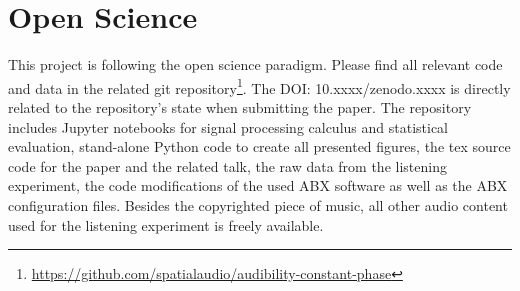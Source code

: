 \section*{Open Science}
This project is following the open science paradigm.
%
Please find all relevant code and data in the related git repository\footnote{
\url{https://github.com/spatialaudio/audibility-constant-phase}}.
%
The DOI: 10.xxxx/zenodo.xxxx is directly related to the repository's state
when submitting the paper.
%
The repository includes Jupyter notebooks for signal processing calculus and
statistical evaluation, stand-alone Python code to create all presented figures,
the tex source code for the paper and the related talk, the
raw data from the listening experiment, the code modifications of the used ABX
software as well as the ABX configuration files.
%
Besides the copyrighted piece of music, all other audio content used for the
listening experiment is freely available.
